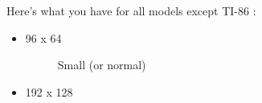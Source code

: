 \documentclass[10pt]{report}
\begin{document}
Here's what you have for all models except TI-86 :\newline
\begin{itemize}
\item 96 x 64
\begin{figure}[H]
\centering
{}
\caption{Small (or normal)}
\end{figure}
\item 192 x 128
\begin{figure}[H]
\centering
{}

\end{figure}
\end{itemize}
\end{document}
